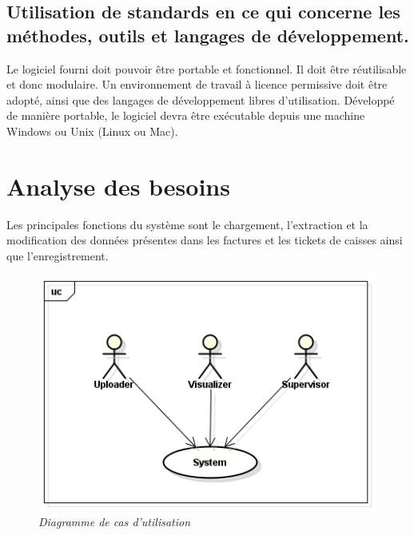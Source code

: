\subsection{Utilisation de standards en ce qui concerne les méthodes, outils et langages de développement.}
Le logiciel fourni doit pouvoir être portable et fonctionnel. Il doit être réutilisable et donc modulaire. Un environnement de travail à licence permissive doit être adopté, ainsi que des langages de développement libres d’utilisation.
Développé de manière portable, le logiciel devra être exécutable depuis une machine Windows ou Unix (Linux ou Mac).


\section{Analyse des besoins}
Les principales fonctions du système sont le chargement, l'extraction et la modification des données présentes dans les factures et les tickets de caisses ainsi que l'enregistrement.
\begin{figure}[h]
	\begin{center}
			\includegraphics[scale = 0.5]{img/usecase.png}
	\end{center}
	\caption{\it Diagramme de cas d'utilisation}
	\label{usecase}

\end{figure}
